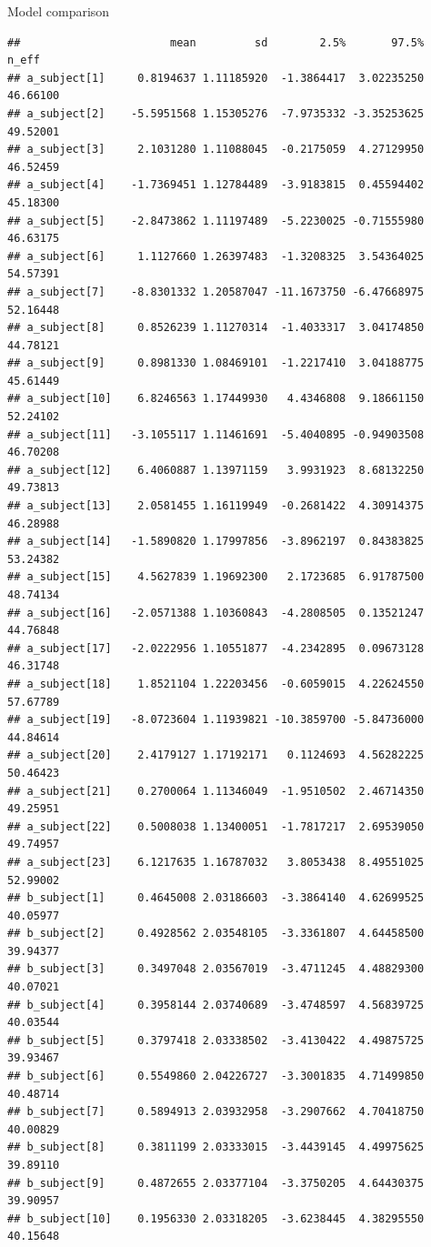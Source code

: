\documentclass[
  ignorenonframetext,
]{beamer}
\begin{document}
\begin{frame}[fragile]{Model comparison}
\begin{verbatim}
##                       mean         sd        2.5%       97.5%      n_eff
## a_subject[1]     0.8194637 1.11185920  -1.3864417  3.02235250   46.66100
## a_subject[2]    -5.5951568 1.15305276  -7.9735332 -3.35253625   49.52001
## a_subject[3]     2.1031280 1.11088045  -0.2175059  4.27129950   46.52459
## a_subject[4]    -1.7369451 1.12784489  -3.9183815  0.45594402   45.18300
## a_subject[5]    -2.8473862 1.11197489  -5.2230025 -0.71555980   46.63175
## a_subject[6]     1.1127660 1.26397483  -1.3208325  3.54364025   54.57391
## a_subject[7]    -8.8301332 1.20587047 -11.1673750 -6.47668975   52.16448
## a_subject[8]     0.8526239 1.11270314  -1.4033317  3.04174850   44.78121
## a_subject[9]     0.8981330 1.08469101  -1.2217410  3.04188775   45.61449
## a_subject[10]    6.8246563 1.17449930   4.4346808  9.18661150   52.24102
## a_subject[11]   -3.1055117 1.11461691  -5.4040895 -0.94903508   46.70208
## a_subject[12]    6.4060887 1.13971159   3.9931923  8.68132250   49.73813
## a_subject[13]    2.0581455 1.16119949  -0.2681422  4.30914375   46.28988
## a_subject[14]   -1.5890820 1.17997856  -3.8962197  0.84383825   53.24382
## a_subject[15]    4.5627839 1.19692300   2.1723685  6.91787500   48.74134
## a_subject[16]   -2.0571388 1.10360843  -4.2808505  0.13521247   44.76848
## a_subject[17]   -2.0222956 1.10551877  -4.2342895  0.09673128   46.31748
## a_subject[18]    1.8521104 1.22203456  -0.6059015  4.22624550   57.67789
## a_subject[19]   -8.0723604 1.11939821 -10.3859700 -5.84736000   44.84614
## a_subject[20]    2.4179127 1.17192171   0.1124693  4.56282225   50.46423
## a_subject[21]    0.2700064 1.11346049  -1.9510502  2.46714350   49.25951
## a_subject[22]    0.5008038 1.13400051  -1.7817217  2.69539050   49.74957
## a_subject[23]    6.1217635 1.16787032   3.8053438  8.49551025   52.99002
## b_subject[1]     0.4645008 2.03186603  -3.3864140  4.62699525   40.05977
## b_subject[2]     0.4928562 2.03548105  -3.3361807  4.64458500   39.94377
## b_subject[3]     0.3497048 2.03567019  -3.4711245  4.48829300   40.07021
## b_subject[4]     0.3958144 2.03740689  -3.4748597  4.56839725   40.03544
## b_subject[5]     0.3797418 2.03338502  -3.4130422  4.49875725   39.93467
## b_subject[6]     0.5549860 2.04226727  -3.3001835  4.71499850   40.48714
## b_subject[7]     0.5894913 2.03932958  -3.2907662  4.70418750   40.00829
## b_subject[8]     0.3811199 2.03333015  -3.4439145  4.49975625   39.89110
## b_subject[9]     0.4872655 2.03377104  -3.3750205  4.64430375   39.90957
## b_subject[10]    0.1956330 2.03318205  -3.6238445  4.38295550   40.15648

\end{verbatim}
\end{frame}
\end{document}
